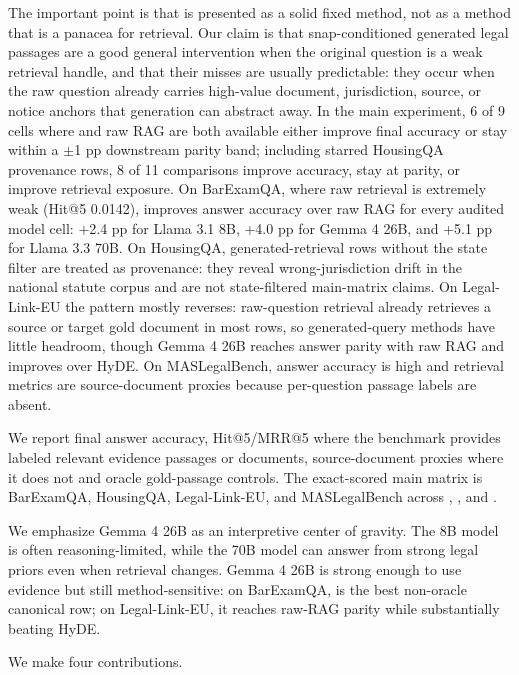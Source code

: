 The important point is that \hyre{} is presented as a solid fixed method, not
as a method that is a panacea for retrieval. Our claim is
that snap-conditioned generated legal passages are a good general intervention
when the original question is a weak retrieval handle, and that their misses are
usually predictable: they occur when the raw question already carries high-value
document, jurisdiction, source, or notice anchors that generation can abstract
away. In the main experiment, 6 of 9 cells where \hyre{} and raw RAG are both
available either improve final accuracy or stay within a $\pm$1 pp downstream
parity band; including starred HousingQA provenance rows, 8 of 11 comparisons
improve accuracy, stay at parity, or improve retrieval exposure. On BarExamQA,
where raw retrieval is extremely weak (Hit@5 0.0142), \hyre{} improves answer
accuracy over raw RAG for every audited model cell: +2.4 pp for Llama 3.1 8B,
+4.0 pp for Gemma 4 26B, and +5.1 pp for Llama 3.3 70B. On HousingQA,
generated-retrieval rows without the state filter are treated as provenance:
they reveal wrong-jurisdiction drift in the national statute corpus and are
not state-filtered main-matrix claims. On Legal-Link-EU the pattern mostly
reverses: raw-question
retrieval already retrieves a source or target gold document in most rows, so
generated-query methods have little headroom, though Gemma 4 26B \hyre{}
reaches answer parity with raw RAG and improves over HyDE. On MASLegalBench,
answer accuracy is high and retrieval metrics are source-document proxies
because per-question passage labels are absent.

We report final answer
accuracy, Hit@5/MRR@5 where the benchmark provides labeled relevant evidence
passages or documents, source-document proxies where it does not and oracle
gold-passage controls. The
exact-scored main matrix is BarExamQA, HousingQA, Legal-Link-EU, and
MASLegalBench across , , and
.

We emphasize Gemma 4 26B as an interpretive center of gravity. The 8B model is
often reasoning-limited, while the 70B model can answer from strong legal
priors even when retrieval changes. Gemma 4 26B is strong enough to use
evidence but still method-sensitive: on BarExamQA, \hyre{} is the best
non-oracle canonical row; on Legal-Link-EU, it reaches raw-RAG parity while
substantially beating HyDE.

We make four contributions.

